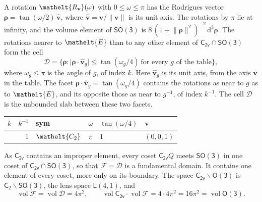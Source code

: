 \documentclass[10pt,a4paper]{article}
\numberwithin{equation}{section}
\newcommand{\eltfont}[1]{{\let\sigma\eltsigma\mathelt{#1}}}
\newcommand{\grp}[1]{\mathsf{#1}}
\newcommand{\cls}[1]{\eltfont{#1}}
\newcommand{\elt}[1]{\eltfont{#1}}
\newcommand{\dirvec}[3]{(#1, #2, #3)}
\newcommand{\unitaxis}{\hat{\mathbf{v}}}
\newcommand{\vv}{\mathbf{v}}
\newcommand{\diff}{\mathrm{d}}
\newcommand{\vol}{\operatorname{vol}}
\newcommand{\rodrigues}{\boldsymbol{\rho}}
\newcommand{\fcell}{\mathcal{D}}
\newcommand{\fdomain}{\mathcal{F}}
\newcommand{\lensspace}[2]{\mathsf{L}(#1, #2)}
\begin{document}
\leavevmode\label{n:vector.rodrigues}\label{n:vector.unitaxis}A rotation $\elt{R_{\vv}}(\omega)$ with $0 \le \omega \le \pi$ has the Rodrigues vector $\rodrigues = \tan(\omega/2)\,\unitaxis$, where $\unitaxis = \vv/\lVert\vv\rVert$ is its unit axis. The rotations by $\pi$ lie at infinity, and the volume element of \href{SO3.pdf}{$\grp{SO(3)}$} is $8\,(1 + \lVert\rodrigues\rVert^2)^{-2}\,\diff^3\rodrigues$.
\leavevmode\label{n:set.cell}The rotations nearer to $\elt{E}$ than to any other element of $\grp{C_{2v}} \cap \grp{SO(3)}$ form the cell
\begin{equation}\label{e:cell}\fcell = \bigl\{\rodrigues : \lvert\rodrigues\cdot\unitaxis_g\rvert \le \tan(\omega_g/4)\ \text{for every $g$ of the table}\bigr\},\end{equation}
where $\omega_g \le \pi$ is the angle of $g$, of index $k$. Here $\unitaxis_g$ is its unit axis, from the axis $\vv$ in the table. The facet $\rodrigues\cdot\unitaxis_g = \tan(\omega_g/4)$ contains the rotations as near to $g$ as to $\elt{E}$, and its opposite those as near to $g^{-1}$, of index $k^{-1}$. The cell $\fcell$ is the unbounded slab between these two facets.
{\small\begin{longtable}{@{}rrllll@{}}\toprule
$k$ & $k^{-1}$ & sym & $\omega$ & $\tan(\omega/4)$ & $\vv$\\\midrule\endhead
\bottomrule\endfoot\endlastfoot
1 & 1 & $\cls{C_{2}}$ & $\pi$ & $1$ & $\dirvec{0}{0}{1}$\\
\bottomrule\end{longtable}}

\leavevmode\label{n:set.fundamental}As $\grp{C_{2v}}$ contains an improper element, every coset $\grp{C_{2v}}Q$ meets \href{SO3.pdf}{$\grp{SO(3)}$} in one coset of $\grp{C_{2v}} \cap \grp{SO(3)}$, so that $\fdomain = \fcell$ is a fundamental domain. It contains one element of every coset, more only on its boundary.
\leavevmode\label{n:set.lens}The space $\grp{C_{2v}}\backslash\grp{O(3)}$ is $\grp{C_{2}}\backslash\grp{SO(3)}$, the lens space $\lensspace{4}{1}$, and
\begin{equation}\label{e:volume}\vol\fdomain = \vol\fcell = 4\pi^2,\qquad \vol\grp{C_{2v}}\cdot\vol\fdomain = 4\cdot 4\pi^2 = 16\pi^2 = \vol\grp{O(3)}.\end{equation}
\end{document}
